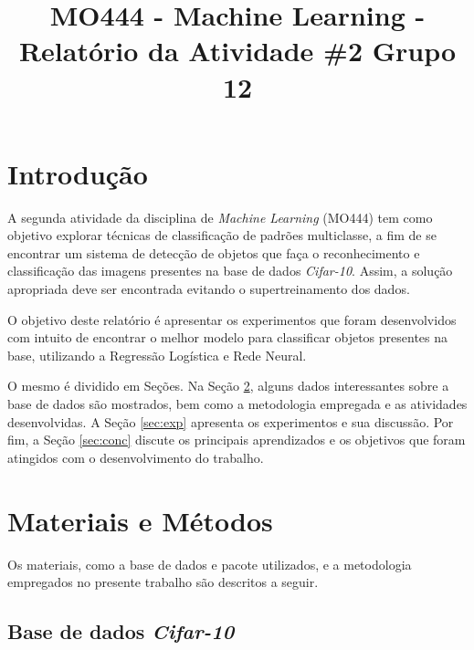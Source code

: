 \documentclass[conference]{IEEEtran}
\begin{document}
\title{MO444 - Machine Learning - Relatório da Atividade \#2 Grupo 12}

\author{
\and
{}
}

\maketitle

\section{Introdução}

A segunda atividade da disciplina de \textit{Machine Learning} (MO444) tem como objetivo explorar técnicas de classificação de padrões multiclasse, a fim de se encontrar um sistema de detecção de objetos que faça o reconhecimento e classificação das imagens presentes na base de dados \textit{Cifar-10}. Assim, a solução apropriada deve ser encontrada evitando o supertreinamento dos dados. 

O objetivo deste relatório é apresentar os experimentos que foram desenvolvidos com intuito de encontrar o melhor modelo para classificar objetos presentes na base, utilizando a Regressão Logística e Rede Neural.

O mesmo é dividido em Seções. Na Seção \ref{sec:meto}, alguns dados interessantes sobre a base de dados são mostrados, bem como a metodologia empregada e as atividades desenvolvidas. A Seção \ref{sec:exp} apresenta os experimentos e sua discussão. Por fim, a Seção \ref{sec:conc} discute os principais aprendizados e os objetivos que foram atingidos com o desenvolvimento do trabalho.

\section{Materiais e Métodos} \label{sec:meto}

Os materiais, como a base de dados e pacote utilizados, e a metodologia empregados no presente trabalho são descritos a seguir.

\subsection{Base de dados \textit{Cifar-10}} \label{sec:base}
\end{document}
